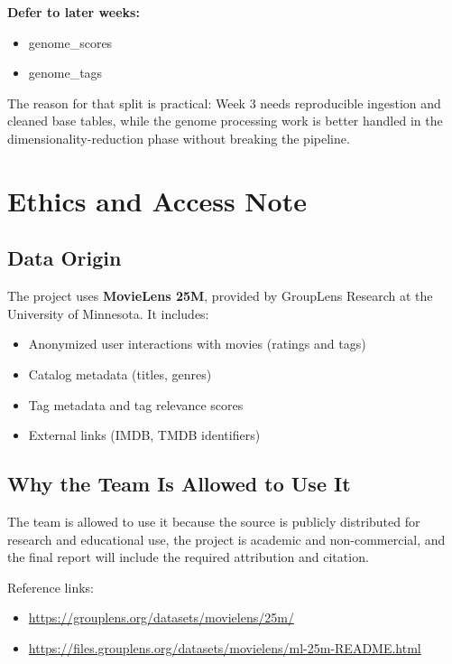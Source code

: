 \documentclass[11pt]{article}
\begin{document}
\textbf{Defer to later weeks:}

\begin{itemize}[leftmargin=1.5em]
    \item genome\_scores
    \item genome\_tags
\end{itemize}

The reason for that split is practical: Week 3 needs reproducible ingestion and cleaned base tables, while the genome processing work is better handled in the dimensionality-reduction phase without breaking the pipeline.

\section{Ethics and Access Note}

\subsection{Data Origin}

The project uses \textbf{MovieLens 25M}, provided by GroupLens Research at the University of Minnesota. It includes:

\begin{itemize}[leftmargin=1.5em]
    \item Anonymized user interactions with movies (ratings and tags)
    \item Catalog metadata (titles, genres)
    \item Tag metadata and tag relevance scores
    \item External links (IMDB, TMDB identifiers)
\end{itemize}

\subsection{Why the Team Is Allowed to Use It}

The team is allowed to use it because the source is publicly distributed for research and educational use, the project is academic and non-commercial, and the final report will include the required attribution and citation.

Reference links:

\begin{itemize}[leftmargin=1.5em]
    \item \url{https://grouplens.org/datasets/movielens/25m/}
    \item \url{https://files.grouplens.org/datasets/movielens/ml-25m-README.html}
\end{itemize}
\end{document}
